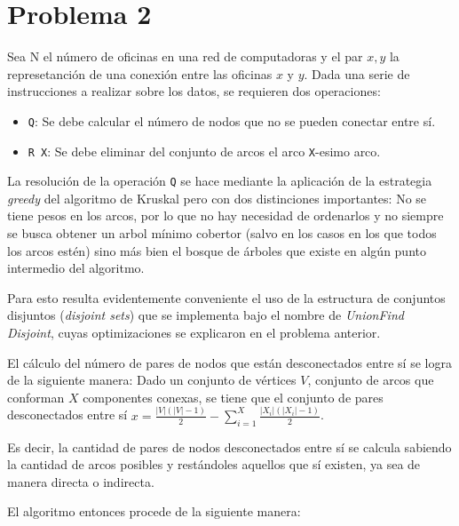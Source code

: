 \documentclass[a4paper,14pt,spanish]{article}
\begin{document}
\clearpage
\section{Problema 2}
Sea N el número de oficinas en una red de computadoras y el par $\displaystyle x, y$ la represetanción de una conexión entre las oficinas $\displaystyle x$ y $\displaystyle y$. Dada una serie de instrucciones a realizar sobre los datos, se requieren dos operaciones:
\begin{itemize}
    \item \texttt{Q}: Se debe calcular el número de nodos que no se pueden conectar entre sí.
    \item \texttt{R X}: Se debe eliminar del conjunto de arcos el arco \texttt{X}-esimo arco.
\end{itemize}

La resolución de la operación \texttt{Q} se hace mediante la aplicación de la estrategia \emph{greedy} del algoritmo de Kruskal pero con dos distinciones importantes: No se tiene pesos en los arcos, por lo que no hay necesidad de ordenarlos y no siempre se busca obtener un arbol mínimo cobertor (salvo en los casos en los que todos los arcos estén) sino más bien el bosque de árboles que existe en algún punto intermedio del algoritmo.

Para esto resulta evidentemente conveniente el uso de la estructura de conjuntos disjuntos (\emph{disjoint sets}) que se implementa bajo el nombre de \emph{UnionFind Disjoint}, cuyas optimizaciones se explicaron en el problema anterior.

El cálculo del número de pares de nodos que están desconectados entre sí se logra de la siguiente manera: Dado un conjunto de vértices $\displaystyle V$, conjunto de arcos que conforman $\displaystyle X$ componentes conexas, se tiene que el conjunto de pares desconectados entre sí $\displaystyle x = \frac{|V|(|V|-1)}{2} - \sum\limits_{i=1}^{X}\frac{|X_i|(|X_i|-1)}{2} $.

Es decir, la cantidad de pares de nodos desconectados entre sí se calcula sabiendo la cantidad de arcos posibles y restándoles aquellos que sí existen, ya sea de manera directa o indirecta.

El algoritmo entonces procede de la siguiente manera:
\end{document}
